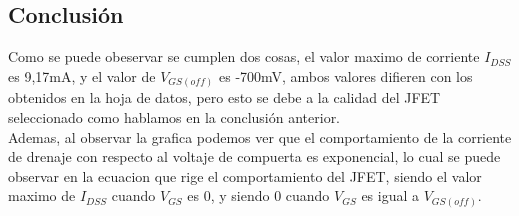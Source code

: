 \vspace{0.05cm}

\newpage

\subsection{Conclusión}

Como se puede obeservar se cumplen dos cosas, el valor maximo de corriente $I_{DSS}$ es 9,17mA, y el valor de $V_{GS(off)}$ es -700mV, ambos valores difieren con los obtenidos en la hoja de datos, pero esto se debe a la calidad del JFET seleccionado como hablamos en la conclusión anterior.\\
Ademas, al observar la grafica podemos ver que el comportamiento de la corriente de drenaje con respecto al voltaje de compuerta es exponencial, lo cual se puede observar en la ecuacion que rige el comportamiento del JFET, siendo el valor maximo de  $I_{DSS}$ cuando $V_{GS}$ es 0, y siendo 0 cuando $V_{GS}$ es igual a $V_{GS(off)}$.
